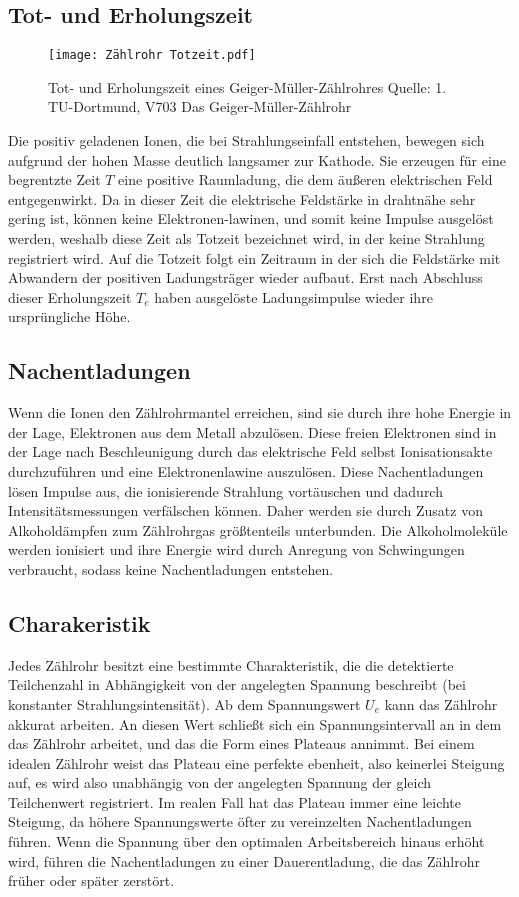 \subsection{Tot- und Erholungszeit}
\begin{figure}[h]
  \centering
  \texttt{[image: Zählrohr Totzeit.pdf]} 
  \caption{Tot- und Erholungszeit eines Geiger-Müller-Zählrohres Quelle: 1. TU-Dortmund, V703 Das Geiger-Müller-Zählrohr} %
  \label{fig:vanadium}
\end{figure}
Die positiv geladenen Ionen, die bei Strahlungseinfall entstehen, bewegen sich aufgrund der hohen Masse deutlich langsamer zur Kathode. Sie erzeugen für eine begrentzte Zeit $T$ eine positive Raumladung, die dem äußeren elektrischen Feld entgegenwirkt. Da in dieser Zeit die elektrische Feldstärke in drahtnähe sehr gering ist, können keine Elektronen-lawinen, und somit keine Impulse ausgelöst werden, weshalb diese Zeit als Totzeit bezeichnet wird, in der keine Strahlung registriert wird. Auf die Totzeit folgt ein Zeitraum in der sich die Feldstärke mit Abwandern der positiven Ladungsträger wieder aufbaut. Erst nach Abschluss dieser Erholungszeit $T_e$ haben ausgelöste Ladungsimpulse wieder ihre ursprüngliche Höhe.
\subsection{Nachentladungen}
Wenn die Ionen den Zählrohrmantel erreichen, sind sie durch ihre hohe Energie in der Lage, Elektronen aus dem Metall abzulösen. Diese freien Elektronen sind in der Lage nach Beschleunigung durch das elektrische Feld selbst Ionisationsakte durchzuführen und eine Elektronenlawine auszulösen. Diese Nachentladungen lösen Impulse aus, die ionisierende Strahlung vortäuschen und dadurch Intensitätsmessungen verfälschen können. Daher werden sie durch Zusatz von Alkoholdämpfen zum Zählrohrgas größtenteils unterbunden. Die Alkoholmoleküle werden ionisiert und ihre Energie wird durch Anregung von Schwingungen verbraucht, sodass keine Nachentladungen entstehen.
\subsection{Charakeristik}
Jedes Zählrohr besitzt eine bestimmte Charakteristik, die die detektierte Teilchenzahl in Abhängigkeit von der angelegten Spannung beschreibt (bei konstanter Strahlungsintensität). Ab dem Spannungswert $U_e$ kann das Zählrohr akkurat arbeiten. An diesen Wert schließt sich ein Spannungsintervall an in dem das Zählrohr arbeitet, und das die Form eines Plateaus annimmt. Bei einem idealen Zählrohr weist das Plateau eine perfekte ebenheit, also keinerlei Steigung auf, es wird also unabhängig von der angelegten Spannung der gleich Teilchenwert registriert. Im realen Fall hat das Plateau immer eine leichte Steigung, da höhere Spannungswerte öfter zu vereinzelten Nachentladungen führen. Wenn die Spannung über den optimalen Arbeitsbereich hinaus erhöht wird, führen die Nachentladungen zu einer Dauerentladung, die das Zählrohr früher oder später zerstört.
